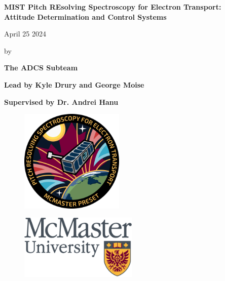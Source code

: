 \documentclass{article}
\begin{document}
\begin{titlepage}
    \begin{center}
    
        \vspace{1cm}

        \textbf{\Large{MIST Pitch REsolving Spectroscopy for Electron Transport:}} \\
        \vspace{0.1cm}
        \textbf{\Large{Attitude Determination and Control Systems}}

        \vspace{1cm}
        \large{April 25 2024}
            
        \vspace{0.75cm}

        by

        \vspace{0.75cm}

        \textbf{\Large{The ADCS Subteam}} 

        \vspace{0.3cm}
        
        \textbf{Lead by Kyle Drury and George Moise}
        
        \vspace{0.3cm}
        
        \textbf{Supervised by Dr. Andrei Hanu}

        \vfill
        

        \begin{figure}[H]
            \centering
                \includegraphics[width=0.44\textwidth]{PRESET-PATCH.png}        
        \end{figure}
        
        \begin{figure}[H]
            \centering
                \includegraphics[width=0.5\textwidth]{McMaster_University_logo.svg.png}
        \end{figure}
            
   \end{center}
\end{titlepage}
\end{document}
